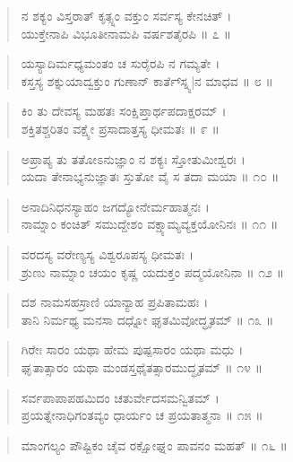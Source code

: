 \begin{verse}
ನ ಶಕ್ಯಂ ವಿಸ್ತರಾತ್ ಕೃತ್ಸ್ನಂ ವಕ್ತುಂ ಸರ್ವಸ್ಯ ಕೇನಚಿತ್ ।\\ಯುಕ್ತೇನಾಪಿ ವಿಭೂತೀನಾಮಪಿ ವರ್ಷಶತೈರಪಿ \num{॥ ೭ ॥}
\end{verse}

\begin{verse}
ಯಸ್ಯಾದಿರ್ಮಧ್ಯಮಂತಂ ಚ ಸುರೈರಪಿ ನ ಗಮ್ಯತೇ ।\\ಕಸ್ತಸ್ಯ ಶಕ್ನುಯಾದ್ವಕ್ತುಂ ಗುಣಾನ್ ಕಾರ್ತೆ್ಸ್ನ್ಯ|ನ ಮಾಧವ \num{॥ ೮ ॥}
\end{verse}

\begin{verse}
ಕಿಂ ತು ದೇವಸ್ಯ ಮಹತಃ ಸಂಕ್ಷಿಪ್ತಾರ್ಥಪದಾಕ್ಷರಮ್ ।\\ಶಕ್ತಿತಶ್ಚರಿತಂ ವಕ್ಷ್ಯೇ ಪ್ರಸಾದಾತ್ತಸ್ಯ ಧೀಮತಃ \num{॥ ೯ ॥}
\end{verse}

\begin{verse}
ಅಪ್ರಾಪ್ಯ ತು ತತೋಽನುಜ್ಞಾಂ ನ ಶಕ್ಯಃ ಸ್ತೋತುಮೀಶ್ವರಃ ।\\ಯದಾ ತೇನಾಭ್ಯನುಜ್ಞಾತಃ ಸ್ತುತೋ ವೈ ಸ ತದಾ ಮಯಾ \num{॥ ೧೦ ॥}
\end{verse}

\begin{verse}
ಅನಾದಿನಿಧನಸ್ಯಾಹಂ ಜಗದ್ಯೋನೇರ್ಮಹಾತ್ಮನಃ ।\\ನಾಮ್ನಾಂ ಕಂಚಿತ್ ಸಮುದ್ದೇಶಂ ವಕ್ಷ್ಯಾಮ್ಯವ್ಯಕ್ತಯೋನಿನಃ \num{॥ ೧೧ ॥}
\end{verse}

\begin{verse}
ವರದಸ್ಯ ವರೇಣ್ಯಸ್ಯ ವಿಶ್ವರೂಪಸ್ಯ ಧೀಮತಃ ।\\ಶ್ರುಣು ನಾಮ್ನಾಂ ಚಯಂ ಕೃಷ್ಣ ಯದುಕ್ತಂ ಪದ್ಮಯೋನಿನಾ \num{॥ ೧೨ ॥}
\end{verse}

\begin{verse}
ದಶ ನಾಮಸಹಸ್ರಾಣಿ ಯಾನ್ಯಾಹ ಪ್ರಪಿತಾಮಹಃ ।\\ತಾನಿ ನಿರ್ಮಥ್ಯ ಮನಸಾ ದಧ್ನೋ ಘೃತಮಿವೋದ್ಧೃತಮ್ \num{॥ ೧೩ ॥}
\end{verse}

\begin{verse}
ಗಿರೇಃ ಸಾರಂ ಯಥಾ ಹೇಮ ಪುಷ್ಪಸಾರಂ ಯಥಾ ಮಧು ।\\ಘೃತಾತ್ಸಾರಂ ಯಥಾ ಮಂಡಸ್ತಥೈತತ್ಸಾರಮುದ್ಧೃತಮ್ \num{॥ ೧೪ ॥}
\end{verse}

\begin{verse}
ಸರ್ವಪಾಪಾಪಹಮಿದಂ ಚತುರ್ವೇದಸಮನ್ವಿತಮ್ ।\\ಪ್ರಯತ್ನೇನಾಧಿಗಂತವ್ಯಂ ಧಾರ್ಯಂ ಚ ಪ್ರಯತಾತ್ಮನಾ \num{॥ ೧೫ ॥}
\end{verse}

\begin{verse}
ಮಾಂಗಲ್ಯಂ ಪೌಷ್ಟಿಕಂ ಚೈವ ರಕ್ಷೋಘ್ನಂ ಪಾವನಂ ಮಹತ್ \num{॥ ೧೬ ॥}
\end{verse}

